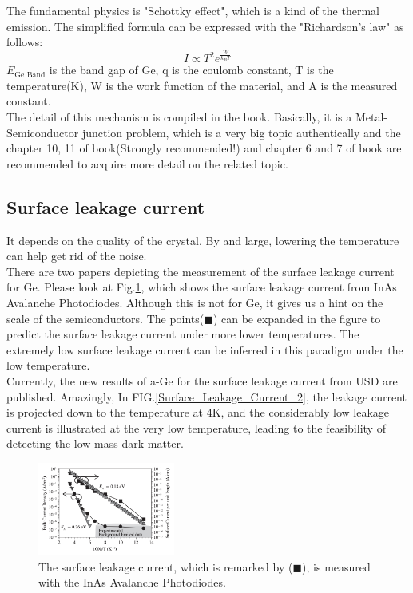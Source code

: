 \documentclass[%
 reprint,
 amsmath,amssymb,
 aps,
]{revtex4-2}
\begin{document}
The fundamental physics is "Schottky effect", which is a kind of the thermal emission. The simplified formula can be expressed with the "Richardson's law" as follows:\\ 
\begin{equation}
I \propto T^{2} e^{\frac{W}{k_{B}T}}
\end{equation}
$E_{\text{Ge Band}}$  is the band gap of Ge, q is the coulomb constant, T is the temperature(K), W is the work function of the material, and A is the measured constant.\\

The detail of this mechanism is compiled in the book\cite{10.5555/1203347}. Basically, it is a Metal-Semiconductor junction problem, which is a very big topic authentically and the chapter 10, 11 of book\cite{10.5555/1203347}(Strongly recommended!) and chapter 6 and 7 of book\cite{MILNES1972171} are recommended to acquire more detail on the related topic.\\

\subsection{Surface leakage current}
It depends on the quality of the crystal. By and large, lowering the temperature can help get rid of the noise.\\ 

There are two papers depicting the measurement of the surface leakage current for Ge. Please look at Fig.\ref{Surface_Leakage_Current}\cite{5871995}, which shows the surface leakage current from InAs Avalanche Photodiodes. Although this is not for Ge, it gives us a hint on the scale of the semiconductors. The points($\blacksquare$) can be expanded in the figure to predict the surface leakage current under more lower temperatures. The extremely low surface leakage current can be inferred in this paradigm under the low temperature.\\ 

Currently, the new results of a-Ge for the surface leakage current from USD are published. Amazingly, In FIG.\ref{Surface_Leakage_Current_2}\cite{Bhattarai:2020tal}, the leakage current is projected down to the temperature at 4K, and the considerably low leakage current is illustrated at the very low temperature, leading to the feasibility of detecting the low-mass dark matter.\\

\begin{figure}[h]
  \centering
  \includegraphics[width=0.4\textwidth]{SHEME/Surface_Leakage_Current.png}
  \caption{The surface leakage current, which is remarked by ($\blacksquare$), is measured with the InAs Avalanche Photodiodes.}
  \label{Surface_Leakage_Current}
\end{figure}
\end{document}
